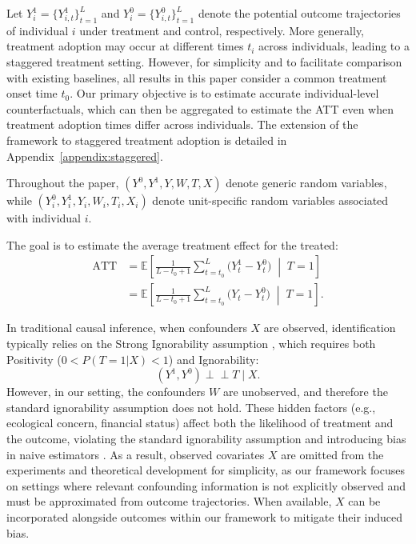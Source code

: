 \documentclass[10pt]{article} %
\begin{document}
{
Let $Y_i^1= \{Y_{i,t}^1\}_{t=1}^{L}$ and $Y_i^0= \{Y_{i,t}^0\}_{t=1}^{L}$ denote the potential outcome trajectories of individual $i$ under treatment and control, respectively. More generally, treatment adoption may occur at different times $t_i$ across individuals, leading to a staggered treatment setting. However, for simplicity and to facilitate comparison with existing baselines, all results in this paper consider a common treatment onset time $t_0$. Our primary objective is to estimate accurate individual-level counterfactuals, which can then be aggregated to estimate the ATT even when treatment adoption times differ across individuals. The extension of the framework to staggered treatment adoption is detailed in Appendix~\ref{appendix:staggered}.
}

{{
Throughout the paper, $(Y^0,Y^1,Y,W,T,X)$ denote generic random variables, while $(Y_i^0,Y_i^1,Y_i,W_i,T_i,X_i)$ denote unit-specific random variables associated with individual $i$.
}}

{
The goal is to estimate the average treatment effect for the treated:
\begin{align}
    \mathrm{ATT}&=
\mathbb{E}\!\left[
\frac{1}{L-t_0+1}
\sum_{t=t_0}^{L}
\bigl(
Y_t^1-Y_t^0
\bigr)
\;\middle|\; T=1
\right] \nonumber
\\
&=
\mathbb{E}\!\left[
\frac{1}{L-t_0+1}
\sum_{t=t_0}^{L}
\bigl(
Y_t-Y_t^0
\bigr)
\;\middle|\; T=1
\right].\nonumber
\end{align}
}

{In traditional causal inference, when confounders $X$ are observed, identification typically relies on the Strong Ignorability assumption \citep{rosenbaum1983central}, which requires both Positivity ($0 < P(T=1|X) < 1$) and Ignorability:
\[
(Y^1, Y^0) \perp\!\!\!\perp T \mid X.
\]}However, in our setting, the confounders $W$ are unobserved, and therefore the standard ignorability assumption does not hold. These hidden factors (e.g., ecological concern, financial status) affect both the likelihood of treatment and the outcome, violating the standard ignorability assumption and introducing bias in naive estimators \citep{cai2012identifying}. {As a result, observed covariates $X$ are omitted from the experiments and theoretical development for simplicity, as our framework focuses on settings where relevant confounding information is not explicitly observed and must be approximated from outcome trajectories. When available, $X$ can be incorporated alongside outcomes within our framework to mitigate their induced bias.}
\end{document}
